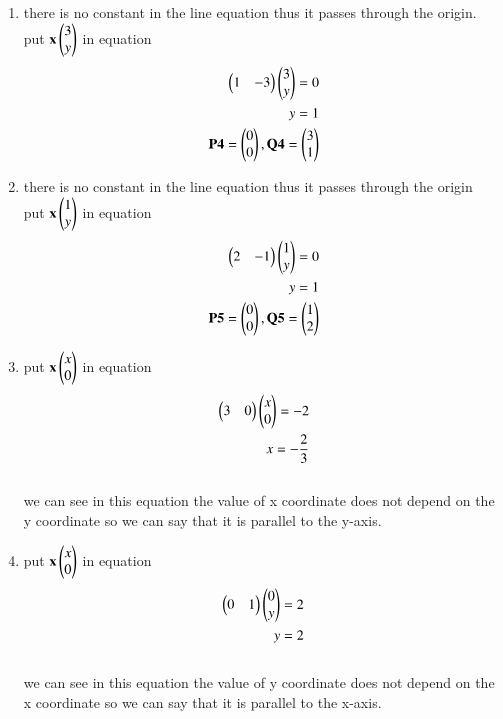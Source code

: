 \begin{enumerate}
\item there is no constant in the line equation thus it passes through the origin.
\\
put $\mathbf x \begin{pmatrix}3\\y\end{pmatrix}$ in equation
\\
\begin{align}
\begin{pmatrix}1 & -3\end{pmatrix}\begin{pmatrix}3\\y\end{pmatrix} = 0
\\
y= 1
\\
\mathbf{P4} = \begin{pmatrix}0\\0\end{pmatrix}, \mathbf{Q4} = \begin{pmatrix}3\\1\end{pmatrix}
\end{align}


\item there is no constant in the line equation thus it passes through the origin
\\
put $\mathbf x \begin{pmatrix}1\\y\end{pmatrix}$ in equation
\\
\begin{align}
\begin{pmatrix}2 & -1\end{pmatrix}\begin{pmatrix}1\\y\end{pmatrix} = 0
\\
y= 1
\\
\mathbf{P5} = \begin{pmatrix}0\\0\end{pmatrix}, \mathbf{Q5} = \begin{pmatrix}1\\2\end{pmatrix}
\end{align}


\item put $\mathbf x \begin{pmatrix}x\\0\end{pmatrix}$ in equation
\begin{align}
\begin{pmatrix}3 & 0\end{pmatrix}\begin{pmatrix}x\\0\end{pmatrix} = -2
\\
x= -\frac{2}{3}
\end{align}
\\
we can see in this equation the  value of x coordinate does not depend on the y coordinate so we can say that it is parallel to the y-axis.





\item put $\mathbf x \begin{pmatrix}x\\0\end{pmatrix}$ in equation 
\begin{align}
\begin{pmatrix}0& 1\end{pmatrix}\begin{pmatrix}0\\y\end{pmatrix} = 2
\\
y= 2
\end{align}
\\
we can see in this equation the  value of y coordinate does not depend on the x coordinate so we can say that it is parallel to the x-axis.




\end{enumerate}

